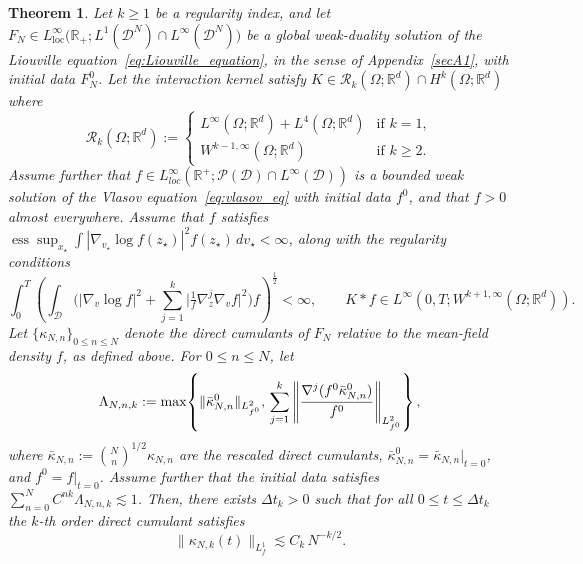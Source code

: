 \documentclass[pdflatex,sn-mathphys-num]{sn-jnl}
\theoremstyle{thmstyleone}%
\newtheorem{theorem}{Theorem}
\theoremstyle{thmstyletwo}%
\theoremstyle{thmstylethree}%
\begin{document}
\begin{theorem}\label{direct_cumulants_bound}
Let $k\geq 1$ be a regularity index, and let $F_N\in L^\infty_{\mathrm{loc}}
\bigl(\mathbb{R}_+;L^1(\mathcal D^N)\cap L^\infty(\mathcal D^N)\bigr)$ be a global weak-duality solution of the Liouville equation~\eqref{eq:Liouville_equation}, in the sense of Appendix~\ref{secA1}, with initial data \(F_N^0\). Let the interaction kernel satisfy \( K \in \mathscr{R}_k(\Omega; \mathbb{R}^d)
 \cap H^{k}(\Omega; \mathbb{R}^d) \) where 
\[
\mathscr{R}_k(\Omega; \mathbb{R}^d)
 :=
\begin{cases}
L^{\infty}(\Omega; \mathbb{R}^d) + L^4(\Omega; \mathbb{R}^d) & \text{if } k = 1, \\
W^{k-1,\infty}(\Omega; \mathbb{R}^d) & \text{if } k \geq 2.
\end{cases}
\] 
Assume further that $f \in L^{\infty}_{loc}(\mathbb{R}^+; \mathcal P(\mathcal D)\cap L^\infty(\mathcal D))$ is a bounded weak solution of the Vlasov equation~\eqref{eq:vlasov_eq} with initial data \(f^0\), and that \(f>0\) almost everywhere. Assume that \(f\) satisfies $\operatorname{ess}\sup_{x_\star} \int |\nabla_{v_\star}\log f(z_\star)|^2 f(z_\star)\,dv_\star < \infty$, along with the regularity conditions
\[
\int_{0}^{T} \left( \int_{\mathcal{D}} \Big( |\nabla_{v} \log f|^{2} + \sum_{j=1}^k \Big| \tfrac{1}{f} \nabla^{j}_{z} \nabla_{v} f \Big|^{2} \Big) f \right)^{\frac{1}{2}} < \infty,
\qquad
K * f \in L^{\infty}\left(0, T; W^{k+1,\infty}(\Omega; \mathbb{R}^d)\right).
\]
Let \(\{\kappa_{N,n}\}_{0\leq n\leq N}\) denote the direct cumulants
of \(F_N\) relative to the mean-field density \(f\), as defined above. For \(0\le n\le N\), let
\begin{equation} \label{Lambda_{N,n,k}}
\Lambda_{N,n,k}
:= \max\!\left\{
\|\bar{\kappa}_{N,n}^{0}\|_{L^2_{f^0}},\,
 \sum_{j=1}^{k}
\left\| \frac{\nabla^j(f^0\bar{\kappa}_{N,n}^{0})}{f^0} \right\|_{L^2_{f^0}}
\right\},
\end{equation}
where $\bar{\kappa}_{N,n} := \binom{N}{n}^{1/2} \kappa_{N,n}$ are the rescaled direct cumulants, $\bar{\kappa}_{N,n}^0 = \bar{\kappa}_{N,n}|_{t=0}$, and $f^0 = f|_{t=0}$. Assume further that the initial data satisfies
$\sum_{n=0}^{N} C^{nk}\Lambda_{N,n,k} \lesssim 1$. Then, there exists $\Delta t_k > 0$ such that for all $0 \leq t \leq \Delta t_k$ the $k$-th order direct cumulant satisfies
\begin{equation}\label{eq:direct_L1_bound1}
\|\kappa_{N,k}(t) \|_{L^1_f}
\lesssim C_k\, N^{-k/2}.
\end{equation}
\end{theorem}
\end{document}
